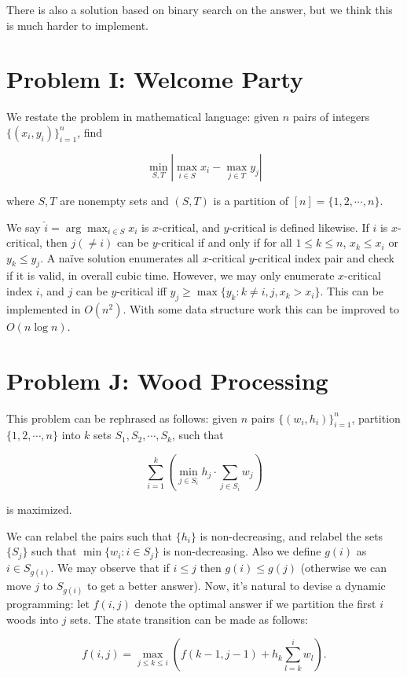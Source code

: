 \documentclass[a4paper,10.5pt,twoside]{article}
\begin{document}
There is also a solution based on binary search on the answer, but we think this is much harder to implement.

\section*{Problem I: Welcome Party}
 
We restate the problem in mathematical language: given $n$ pairs of integers $\{(x_i, y_i)\}_{i=1}^n$, find

$$ \min_{S, T} | \max_{i \in S} x_i - \max_{j \in T} y_j | $$

where $S, T$ are nonempty sets and $(S, T)$ is a partition of $[n] = \{1, 2, \cdots, n\}$.

We say $\hat{i} = \arg\max_{i \in S} x_i$ is $x$-critical, and $y$-critical is defined likewise. If $i$ is $x$-critical, then $j (\neq i)$ can be $y$-critical if and only if for all $1 \leq k \leq n$, $x_k \leq x_i$ or $y_k \leq y_j$. A na\"ive solution enumerates all $x$-critical $y$-critical index pair and check if it is valid, in overall cubic time. However, we may only enumerate $x$-critical index $i$, and $j$ can be $y$-critical iff $y_j \geq \max\{y_k : k \neq i, j, x_k > x_i\}$. This can be implemented in $O(n^2)$. With some data structure work this can be improved to $O(n \log n)$.

\section*{Problem J: Wood Processing}

This problem can be rephrased as follows: given $n$ pairs $\{(w_i, h_i)\}_{i=1}^n$, partition $\{1, 2, \cdots, n\}$ into $k$ sets $S_1, S_2, \cdots, S_k$, such that 

$$ \sum_{i=1}^k \left(\min_{j \in S_i} h_j \cdot \sum_{j \in S_i} w_j \right) $$

is maximized.

We can relabel the pairs such that $\{h_i\}$ is non-decreasing, and relabel the sets $\{S_j\}$ such that $\min\{w_i : i \in S_j\}$ is non-decreasing. Also we define $g(i)$ as $i \in S_{g(i)}$. We may observe that if $i \leq j$ then $g(i) \leq g(j)$ (otherwise we can move $j$ to $S_{g(i)}$ to get a better answer). Now, it's natural to devise a dynamic programming: let $f(i,j)$ denote the optimal answer if we partition the first $i$ woods into $j$ sets. The state transition can be made as follows:

$$ f(i,j) = \max_{j \leq k \leq i} \left( f(k-1, j-1) + h_{k} \sum_{l = k}^i w_l \right). $$
\end{document}
